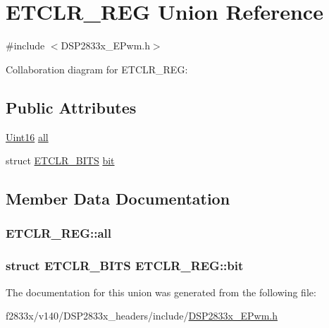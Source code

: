 \hypertarget{union_e_t_c_l_r___r_e_g}{}\section{E\+T\+C\+L\+R\+\_\+\+R\+E\+G Union Reference}
\label{union_e_t_c_l_r___r_e_g}


{\ttfamily \#include $<$D\+S\+P2833x\+\_\+\+E\+Pwm.\+h$>$}



Collaboration diagram for E\+T\+C\+L\+R\+\_\+\+R\+E\+G\+:
\subsection*{Public Attributes}
\begin{DoxyCompactItemize}
\item 
\hyperlink{_d_s_p2833x___device_8h_a59a9f6be4562c327cbfb4f7e8e18f08b}{Uint16} \hyperlink{union_e_t_c_l_r___r_e_g_a9d3d4240a799621100cba7c10f69a8d7}{all}
\item 
struct \hyperlink{struct_e_t_c_l_r___b_i_t_s}{E\+T\+C\+L\+R\+\_\+\+B\+I\+T\+S} \hyperlink{union_e_t_c_l_r___r_e_g_a0c883684f9a77e7df903c4cba451b61f}{bit}
\end{DoxyCompactItemize}


\subsection{Member Data Documentation}
\hypertarget{union_e_t_c_l_r___r_e_g_a9d3d4240a799621100cba7c10f69a8d7}{}
\subsubsection[{all}]{ E\+T\+C\+L\+R\+\_\+\+R\+E\+G\+::all}\label{union_e_t_c_l_r___r_e_g_a9d3d4240a799621100cba7c10f69a8d7}
\hypertarget{union_e_t_c_l_r___r_e_g_a0c883684f9a77e7df903c4cba451b61f}{}
\subsubsection[{bit}]{\setlength{\rightskip}{0pt plus 5cm}struct {\bf E\+T\+C\+L\+R\+\_\+\+B\+I\+T\+S} E\+T\+C\+L\+R\+\_\+\+R\+E\+G\+::bit}\label{union_e_t_c_l_r___r_e_g_a0c883684f9a77e7df903c4cba451b61f}


The documentation for this union was generated from the following file\+:\begin{DoxyCompactItemize}
\item 
f2833x/v140/\+D\+S\+P2833x\+\_\+headers/include/\hyperlink{_d_s_p2833x___e_pwm_8h}{D\+S\+P2833x\+\_\+\+E\+Pwm.\+h}\end{DoxyCompactItemize}
